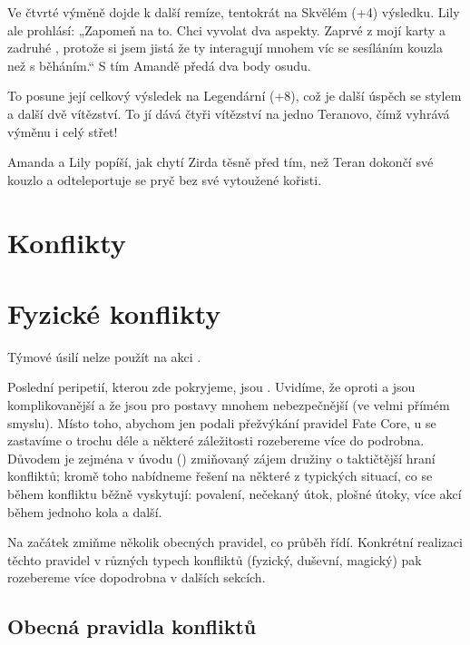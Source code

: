\documentclass[../main.tex]{subfiles}
\begin{document}
Ve čtvrté výměně dojde k další remíze, tentokrát na Skvělém (+4) výsledku. Lily ale
prohlásí: „Zapomeň na to. Chci vyvolat dva aspekty. Zaprvé  z
mojí karty a zadruhé , protože si jsem jistá že ty interagují mnohem
víc se sesíláním kouzla než s běháním.“ S tím Amandě předá dva body osudu.

To posune její celkový výsledek na Legendární (+8), což je další úspěch se stylem a další
dvě vítězství. To jí dává čtyři vítězství na jedno Teranovo, čímž vyhrává výměnu i celý střet!

Amanda a Lily popíší, jak chytí Zirda těsně před tím, než Teran dokončí své kouzlo a
odteleportuje se pryč bez své vytoužené kořisti.

\section{Konflikty}

\section{Fyzické konflikty}
\label{sec:boj}

\begin{prozatimni}
  Týmové úsilí nelze použít na akci .
\end{prozatimni}

Poslední peripetií, kterou zde pokryjeme, jsou . Uvidíme, že oproti
 a  jsou komplikovanější a že jsou pro postavy mnohem
nebezpečnější (ve velmi přímém smyslu). Místo toho, abychom jen podali přežvýkání
pravidel Fate Core, u  se zastavíme o trochu déle a některé záležitosti
rozebereme více do podrobna. Důvodem je zejména v úvodu ()
zmiňovaný zájem družiny o taktičtější hraní konfliktů; kromě toho nabídneme řešení na
některé z typických situací, co se během konfliktu běžně vyskytují: povalení, nečekaný
útok, plošné útoky, více akcí během jednoho kola a další.

Na začátek zmiňme několik obecných pravidel, co průběh  řídí. Konkrétní
realizaci těchto pravidel v různých typech konfliktů (fyzický, duševní, magický) pak
rozebereme více dopodrobna v dalších sekcích.

\subsection{Obecná pravidla konfliktů}
\label{sec:obecna-pravidla}
\end{document}
